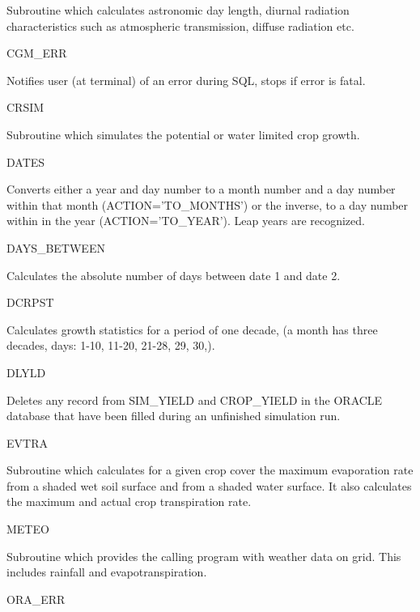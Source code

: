 \begin{indenting}{5.08cm}
Subroutine which calculates astronomic day length, diurnal
radia\-tion characteristics such as atmospheric transmission,
diffuse radiation etc.
\end{indenting}
CGM\_ERR
\testlastline

\begin{indenting}{5.08cm}
Notifies user (at terminal) of an error during SQL, stops if
error is fatal.
\end{indenting}
CRSIM
\testlastline

\begin{indenting}{5.08cm}
Subroutine which simulates the potential or water limited
crop growth.
\end{indenting}
DATES
\testlastline

\begin{indenting}{5.08cm}
Converts either a year and day number to a month num\-ber
and a day number within that month (ACTI\-ON='TO\-{\nobreak}\_MONTHS') or the inverse, to a day number within in the
year (ACTI\-{\nobreak}ON='TO\_YEAR'). Leap years are recognized.
\end{indenting}
DAYS\_BETWEEN
\testlastline

\begin{indenting}{5.08cm}
Calculates the absolute number of days between date 1 and
date 2.
\end{indenting}
DCRPST
\testlastline

\begin{indenting}{5.08cm}
Calculates growth statistics for a period of one decade, (a
month has three decades, days: 1-10, 11-20, 21-28, 29, 30,).
\end{indenting}
DLYLD
\testlastline

\begin{indenting}{5.08cm}
Deletes any record from SIM\_YIELD and CROP\_YIELD in
the ORACLE database that have been filled during an unfin\-ished simulati\-on run.
\end{indenting}
EVTRA
\testlastline

\begin{indenting}{5.08cm}
Subroutine which calculates for a given crop cover the maxi\-mum evaporation rate  from a shaded wet soil surfa\-ce and
from a shaded water surface. It also calculates the maximum
and actual crop transpiration rate.
\end{indenting}
METEO
\testlastline

\begin{indenting}{5.08cm}
Subroutine which provides the calling program with weat\-her
data on grid. This includes rainfall and evapotranspi\-ra\-tion.
\end{indenting}
ORA\_ERR
\testlastline

